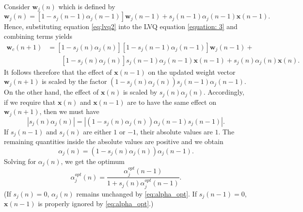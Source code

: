 \begin{enumerate}
\begin{solution}
\begin{enumerate}
      Consider $\mathbf{w}_j(n)$ which is defined by
      \begin{equation}
        \mathbf{w}_j(n) = [1 - s_j(n-1) \alpha_j(n-1)]
        \mathbf{w}_j(n-1) + s_j(n-1) \alpha_j(n-1) \mathbf{x}(n-1).
        \label{eq:lvq2}
      \end{equation}
      Hence, substituting equation \eqref{eq:lvq2} into the LVQ
      equation \eqref{equation: 3} and combining terms yields
      \begin{align*}
        \mathbf{w}_c(n+1) &= \left[1 - s_j(n) \alpha_j(n)\right]
        \left[1 - s_j(n-1) \alpha_j(n-1)\right] \mathbf{w}_j(n-1) +
        \\
        &\qquad \left[1 - s_j(n) \alpha_j(n)\right] s_j(n-1)
        \alpha_j(n-1) \mathbf{x}(n-1) + s_j(n) \alpha_j(n)
        \mathbf{x}(n).
      \end{align*}
      It follows therefore that the effect of $\mathbf{x}(n-1)$ on the
      updated weight vector $\mathbf{w}_j(n+1)$ is scaled by the
      factor $(1-s_j(n)\alpha_j(n)) s_j(n-1) \alpha_j(n-1)$. On the
      other hand, the effect of $\mathbf{x}(n)$ is scaled by
      $s_j(n)\alpha_j(n)$.  Accordingly, if we require that
      $\mathbf{x}(n)$ and $\mathbf{x}(n-1)$ are to have the same
      effect on $\mathbf{w}_j(n+1)$, then we must have
      \begin{equation*}
        | s_j(n) \alpha_j(n) |= | (1-s_j(n)\alpha_j(n))\alpha_j(n-1) s_j(n-1) |.
      \end{equation*}
      If $s_j(n-1)$ and $s_j(n)$ are either $1$ or $-1$, their
      absolute values are $1$. The remaining quantities inside the
      absolute values are positive and we obtain
      \begin{equation*}
        \alpha_j(n) = (1-s_j(n)\alpha_j(n))\alpha_j(n-1) .
      \end{equation*}
      Solving for $\alpha_j(n)$, we get the optimum
      \begin{equation}
        \alpha_j^{opt}(n) = \frac {\alpha_j^{opt}(n-1)} {1 +
          s_j(n)\alpha_j^{opt}(n-1)}. \label{eq:alpha_opt}
      \end{equation}
      (If $s_j(n)=0$, $\alpha_j(n)$ remains unchanged by
      \eqref{eq:alpha_opt}.  If $s_j(n-1)=0$, $\mathbf{x}(n-1)$ is
      properly ignored by \eqref{eq:alpha_opt}.)


    \end{enumerate}

  \end{solution}
  


\end{enumerate}
